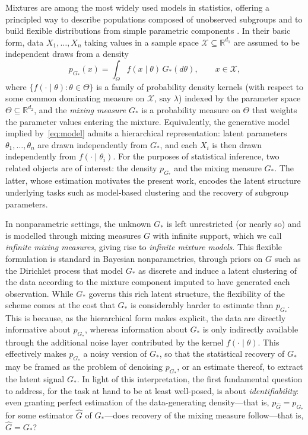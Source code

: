 \documentclass[11pt,twoside]{article} %
\begin{document}
Mixtures are among the most widely used models in statistics, offering a
principled way to describe populations composed of unobserved subgroups and to
build flexible distributions from simple parametric components
\citep{mclachlan2000finite,fraley2002model}. In their basic form, data
$X_1,\ldots,X_n$ taking values in a sample space $\mathcal X\subseteq\mathbb
R^{d_1}$ are assumed to be independent draws from a density
%
\begin{equation}\label{eq:model}
    p_{G_*}(x)=\int_{\Theta}f(x\mid\theta)\,G_*(d\theta), \qquad x \in \mathcal{X},
\end{equation}
%
where $\{f(\cdot\mid\theta):\theta\in\Theta\}$ is a family of probability
density kernels (with respect to some common dominating measure on $\mathcal{X}$, say $\lambda$) indexed by the parameter space $\Theta\subseteq\mathbb
R^{d_2}$, and the \emph{mixing measure} $G_*$ is a probability measure on
$\Theta$ that weights the parameter values entering the mixture. Equivalently,
the generative model implied by~\eqref{eq:model} admits a hierarchical representation: latent parameters
$\theta_1,\ldots,\theta_n$ are drawn independently from $G_*$, and each $X_i$ is
then drawn independently from $f(\cdot\mid\theta_i)$. For the purposes of
statistical inference, two related objects are of interest: the density
$p_{G_*}$ and the mixing measure $G_*$. The latter, whose estimation motivates
the present work, encodes the latent structure underlying
tasks such as model-based clustering and the recovery of subgroup parameters.

In nonparametric settings, the unknown $G_*$ is left unrestricted (or nearly so) and is modelled
through mixing measures $G$ with infinite support, which we call \emph{infinite
mixing measures}, giving rise to \emph{infinite mixture models}. This flexible
formulation is standard in Bayesian nonparametrics, through priors on $G$ such
as the Dirichlet process \citep{Ferguson,ferguson1983bayesian,lo1984class}
that model $G_*$ as discrete and induce a latent clustering of the data
according to the mixture component imputed to have generated each observation.
While $G_*$ governs this rich latent structure, the flexibility of the scheme
comes at the cost that $G_*$ is considerably harder to estimate than $p_{G_*}$. This is because, as the
hierarchical form makes explicit, the data are directly informative about $p_{G_*}$, whereas information about $G_*$ is only indirectly available through the additional noise layer
contributed by the kernel $f(\cdot\mid\theta)$. This effectively makes $p_{G_*}$ a noisy
version of $G_*$, so that the statistical recovery of $G_*$ may be framed as the problem of denoising $p_{G_*}$, or an estimate thereof, to extract the latent signal $G_*$. In light of this interpretation, the first fundamental question to address, for the task at hand to be at least well-posed, is about \emph{identifiability}: even granting perfect estimation of the data-generating density---that is, $p_{\hat G}=p_{G_*}$ for some estimator $\hat G$ of $G_*$---does recovery of
the mixing measure follow---that is, $\hat G=G_*$?
\end{document}
